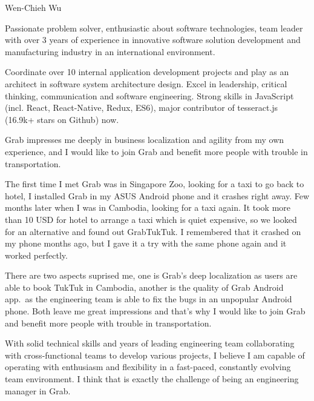 \documentclass[11pt, a4paper]{awesome-cv}
\begin{document}
\makecvheader[R]

\makecvfooter
  {}
  {Wen-Chieh Wu}
  {}

\makelettertitle

\begin{cvletter}

Passionate problem solver, enthusiastic about software technologies, team leader with over 3 years of experience in innovative software solution development and manufacturing industry in an international environment.

Coordinate over 10 internal application development projects and play as an architect in software system architecture design. Excel in leadership, critical thinking, communication and software engineering. Strong skills in JavaScript (incl. React, React-Native, Redux, ES6), major contributor of tesseract.js (16.9k+ stars on Github) now.

Grab impresses me deeply in business localization and agility from my own experience, and I would like to join Grab and benefit more people with trouble in transportation.

The first time I met Grab was in Singapore Zoo, looking for a taxi to go back to hotel, I installed Grab in my ASUS Android phone and it crashes right away. Few months later when I was in Cambodia, looking for a taxi again. It took more than 10 USD for hotel to arrange a taxi which is quiet expensive, so we looked for an alternative and found out GrabTukTuk. I remembered that it crashed on my phone months ago, but I gave it a try with the same phone again and it worked perfectly.

There are two aspects suprised me, one is Grab's deep localization as users are able to book TukTuk in Cambodia, another is the quality of Grab Android app.\ as the engineering team is able to fix the bugs in an unpopular Android phone. Both leave me great impressions and that's why I would like to join Grab and benefit more people with trouble in transportation.

With solid technical skills and years of leading engineering team collaborating with cross-functional teams to develop various projects, I believe I am capable of operating with enthusiasm and flexibility in a fast-paced, constantly evolving team environment. I think that is exactly the challenge of being an engineering manager in Grab.

\end{cvletter}


\makeletterclosing
\end{document}
